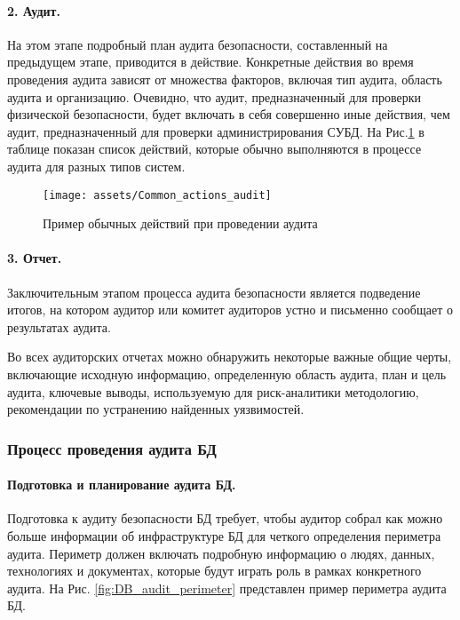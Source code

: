 \paragraph{2. Аудит.}

На этом этапе подробный план аудита безопасности, составленный на предыдущем этапе, приводится в действие. Конкретные действия во время проведения аудита зависят от множества факторов, включая тип аудита, область аудита и организацию. Очевидно, что аудит, предназначенный для проверки физической безопасности, будет включать в себя совершенно иные действия, чем аудит, предназначенный для проверки администрирования СУБД. На Рис.\ref{fig:Common_actions_audit} в таблице показан список действий, которые обычно выполняются в процессе аудита для разных типов систем.

\begin{figure}[h!]
    \centering
    \texttt{[image: assets/Common\_actions\_audit]}
    \caption{Пример обычных действий при проведении аудита}
	\label{fig:Common_actions_audit}
\end{figure}

\paragraph{3. Отчет.}

Заключительным этапом процесса аудита безопасности является подведение итогов, на котором аудитор или комитет аудиторов устно и письменно сообщает о результатах аудита.

Во всех аудиторских отчетах можно обнаружить некоторые важные общие черты, включающие исходную информацию, определенную область аудита, план и цель аудита, ключевые выводы, используемую для риск-аналитики методологию, рекомендации по устранению найденных уязвимостей.

\subsubsection{Процесс проведения аудита БД}

\paragraph{Подготовка и планирование аудита БД.}

Подготовка к аудиту безопасности БД требует, чтобы аудитор собрал как можно больше информации об инфраструктуре БД для четкого определения периметра аудита. Периметр должен включать подробную информацию о людях, данных, технологиях и документах, которые будут играть роль в рамках конкретного аудита. На Рис. \ref{fig:DB_audit_perimeter} представлен пример периметра аудита БД.


